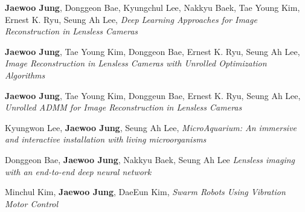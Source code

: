 \documentclass[a4paper,12pt]{memoir} %
\begin{document}



{\textbf{Jaewoo Jung}, Donggeon Bae, Kyungchul Lee, Nakkyu Baek, Tae Young Kim, Ernest K. Ryu, Seung Ah Lee, \textit{Deep Learning Approaches for Image Reconstruction in Lensless Cameras}}




{\textbf{Jaewoo Jung}, Tae Young Kim, Donggeon Bae, Ernest K. Ryu, Seung Ah Lee, \textit{Image Reconstruction in Lensless Cameras with Unrolled Optimization Algorithms}}



{\textbf{Jaewoo Jung}, Tae Young Kim, Donggeun Bae, Ernest K. Ryu, Seung Ah Lee, \textit{Unrolled ADMM for Image Reconstruction in Lensless Cameras}}



{Kyungwon Lee, \textbf{Jaewoo Jung}, Seung Ah Lee, \textit{MicroAquarium: An immersive and interactive installation with living microorganisms}}



{Donggeon Bae, \textbf{Jaewoo Jung}, Nakkyu Baek, Seung Ah Lee \textit{Lensless imaging with an end-to-end deep neural network}}



{Minchul Kim, \textbf{Jaewoo Jung}, DaeEun Kim, \textit{Swarm Robots Using Vibration Motor Control}}

\end{document}
